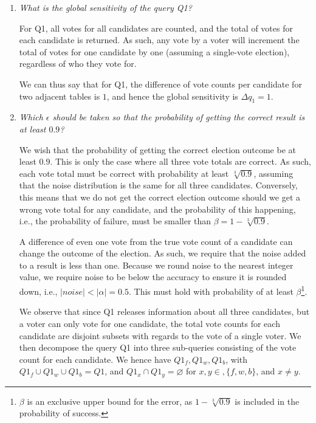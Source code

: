 \documentclass[parskip=half]{scrartcl}
\begin{document}
\begin{enumerate}
    \item \textit{What is the global sensitivity of the query Q1?}
    
    For Q1, all votes for all candidates are counted, and the total of votes
    for each candidate is returned. As such, any vote by a voter will increment
    the total of votes for one candidate by one (assuming a single-vote
    election), regardless of who they vote for.

    We can thus say that for Q1, the difference of vote counts per candidate
    for two adjacent tables is $1$, and hence the global sensitivity is
    $\Delta q_1 = 1$.
    
    \item \textit{Which $\epsilon$ should be taken so that the probability of
    getting the correct result is at least $0.9$?}

    We wish that the probability of getting the correct election outcome be at
    least $0.9$. This is only the case where all three vote totals are correct.
    As such, each vote total must be correct with probability at least
    $\sqrt[3]{0.9}$, assuming that the noise distribution is the same for all
    three candidates. Conversely, this means that we do not get the correct
    election outcome should we get a wrong vote total for any candidate, and
    the probability of this happening, i.e., the probability of failure, must
    be smaller than $\beta = 1-\sqrt[3]{0.9}$.

    A difference of even one vote from the true vote count of a candidate can
    change the outcome of the election. As such, we require that the noise
    added to a result is less than one. Because we round noise to the nearest
    integer value, we require noise to be below the accuracy to ensure it is
    rounded down, i.e., $|\textit{noise}| < |\alpha| = 0.5$. This must hold
    with probability of at least $\beta$\footnote{$\beta$ is an exclusive
    upper bound for the error, as $1-\sqrt[3]{0.9}$ is included in the
    probability of success.}.

    We observe that since Q1 releases information about all three candidates,
    but a voter can only vote for one candidate, the total vote counts for each
    candidate are disjoint subsets with regards to the vote of a single voter.
    We then decompose the query Q1 into three sub-queries consisting of the
    vote count for each candidate. We hence have $Q1_f, Q1_w, Q1_b$, with
    $Q1_f \cup Q1_w \cup Q1_b = Q1$, and $Q1_x \cap Q1_y = \varnothing$ for
    $x, y\in, \{f, w, b\}$, and $x\neq y$.


\end{enumerate}
\end{document}
